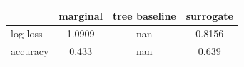 \begin{tabular}{lccc}
\toprule
 & marginal & tree baseline & surrogate \\
\midrule
log loss & 1.0909 & nan & 0.8156 \\
accuracy & 0.433 & nan & 0.639 \\
\bottomrule
\end{tabular}
